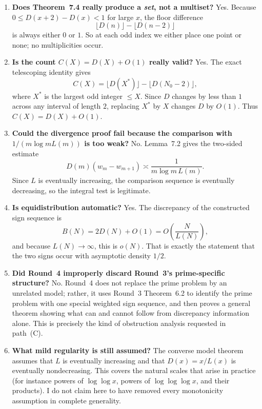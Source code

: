 \begin{enumerate}
\item \textbf{Does Theorem~7.4 really produce a \emph{set}, not a multiset?}
Yes.
Because $0\le D(x+2)-D(x)<1$ for large $x$, the floor difference
\[
\lfloor D(n)\rfloor-\lfloor D(n-2)\rfloor
\]
is always either $0$ or $1$.
So at each odd index we either place one point or none; no multiplicities occur.

\item \textbf{Is the count $C(X)=D(X)+O(1)$ really valid?}
Yes.
The exact telescoping identity gives
\[
C(X)=\lfloor D(X^*)\rfloor-\lfloor D(N_0-2)\rfloor,
\]
where $X^*$ is the largest odd integer $\le X$.
Since $D$ changes by less than $1$ across any interval of length $2$, replacing $X^*$ by $X$ changes $D$ by $O(1)$.
Thus $C(X)=D(X)+O(1)$.

\item \textbf{Could the divergence proof fail because the comparison with $1/(m\log mL(m))$ is too weak?}
No.
Lemma~7.2 gives the two-sided estimate
\[
D(m)(w_m-w_{m+1})\asymp \frac{1}{m\log m\,L(m)}.
\]
Since $L$ is eventually increasing, the comparison sequence is eventually decreasing, so the integral test is legitimate.

\item \textbf{Is equidistribution automatic?}
Yes.
The discrepancy of the constructed sign sequence is
\[
B(N)=2D(N)+O(1)=O\!\left(\frac{N}{L(N)}\right),
\]
and because $L(N)\to\infty$, this is $o(N)$.
That is exactly the statement that the two signs occur with asymptotic density $1/2$.

\item \textbf{Did Round~4 improperly discard Round~3's prime-specific structure?}
No.
Round~4 does not replace the prime problem by an unrelated model; rather, it uses Round~3 Theorem~6.2 to identify the prime problem with one special weighted sign sequence, and then proves a general theorem showing what can and cannot follow from discrepancy information alone.
This is precisely the kind of obstruction analysis requested in path~(C).

\item \textbf{What mild regularity is still assumed?}
The converse model theorem assumes that $L$ is eventually increasing and that $D(x)=x/L(x)$ is eventually nondecreasing.
This covers the natural scales that arise in practice (for instance powers of $\log\log x$, powers of $\log\log\log x$, and their products).
I do not claim here to have removed every monotonicity assumption in complete generality.
\end{enumerate}

